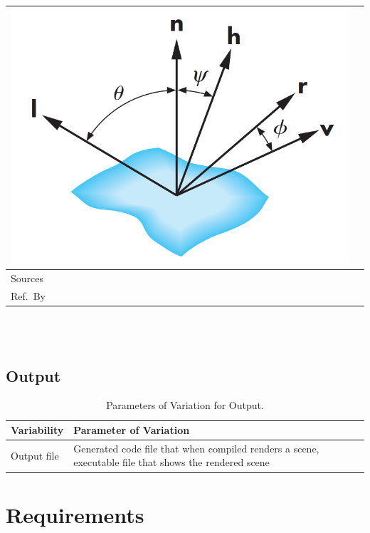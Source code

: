 \documentclass[12pt]{article}
\newcommand{\colAwidth}{0.13\textwidth}
\newcommand{\colBwidth}{0.82\textwidth}
\begin{document}
\begin{minipage}{\textwidth}
\begin{tabular}{| p{\colAwidth} | p{\colBwidth}|}
		\includegraphics[scale=0.4]{./images/blinn-phong-reflection-model-vectors}\\
		\hline
		Sources& \cite{Comninos2005,Lengyel2003,shreiner2012} \\
		\hline
		Ref.\ By & \\
		\hline
	\end{tabular}
\end{minipage}\\

~\newline

\subsection{Output} \label{sec_Output}    
\begin{table}[h]
	\centering
	\begin{tabular}{|p{5cm}|p{10cm}|}
		\hline
		\textbf{Variability} & \textbf{Parameter of Variation} \\
		\hline
		Output file & Generated code file that when compiled renders a scene, 
		executable file that shows the rendered scene\\
		\hline
	\end{tabular}
	\caption{Parameters of Variation for Output.}
	\label{tbl:Output_Variations}
\end{table}

\section{Requirements}
\end{document}
